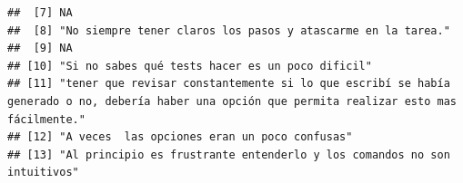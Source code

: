 \documentclass[
]{article}
\begin{document}
\begin{verbatim}
##  [7] NA                                                                                                                                                                                                                                                                                                                                                                                                       
##  [8] "No siempre tener claros los pasos y atascarme en la tarea."                                                                                                                                                                                                                                                                                                                                             
##  [9] NA                                                                                                                                                                                                                                                                                                                                                                                                       
## [10] "Si no sabes qué tests hacer es un poco dificil"                                                                                                                                                                                                                                                                                                                                                         
## [11] "tener que revisar constantemente si lo que escribí se había generado o no, debería haber una opción que permita realizar esto mas fácilmente."                                                                                                                                                                                                                                                          
## [12] "A veces  las opciones eran un poco confusas"                                                                                                                                                                                                                                                                                                                                                            
## [13] "Al principio es frustrante entenderlo y los comandos no son intuitivos"                                                                                                                                                                                                                                                                                                                                 

\end{verbatim}
\end{document}
